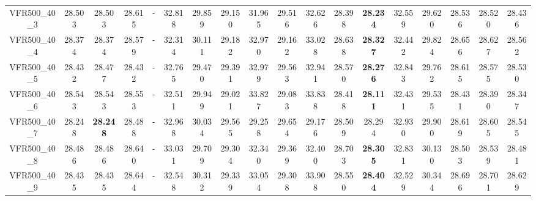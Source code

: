 \begin{tabular}{cc|ccc|ccccccccccccc}
VFR500\_40\_3      & 28.503           & 28.503           & 28.615           & -                & 32.818           & 29.859           & 29.150           & 31.965           & 29.516           & 32.626           & 28.398           & {\bf 28.234}     & 32.559           & 29.620           & 28.536           & 28.520           & 28.436          \\ 
VFR500\_40\_4      & 28.374           & 28.374           & 28.579           & -                & 32.314           & 30.111           & 29.182           & 32.970           & 29.162           & 33.028           & 28.638           & {\bf 28.327}     & 32.442           & 29.824           & 28.656           & 28.627           & 28.562          \\ 
VFR500\_40\_5      & 28.432           & 28.477           & 28.432           & -                & 32.765           & 29.470           & 29.391           & 32.979           & 29.563           & 32.941           & 28.570           & {\bf 28.276}     & 32.843           & 29.762           & 28.615           & 28.575           & 28.530          \\ 
VFR500\_40\_6      & 28.543           & 28.543           & 28.553           & -                & 32.511           & 29.949           & 29.021           & 33.827           & 29.083           & 33.838           & 28.418           & {\bf 28.111}     & 32.431           & 29.535           & 28.431           & 28.390           & 28.347          \\ 
VFR500\_40\_7      & 28.248           & {\bf 28.248}     & 28.488           & -                & 32.968           & 30.034           & 29.565           & 29.258           & 29.654           & 29.176           & 28.509           & 28.294           & 32.930           & 29.900           & 28.619           & 28.605           & 28.545          \\ 
VFR500\_40\_8      & 28.486           & 28.486           & 28.640           & -                & 33.031           & 29.709           & 29.304           & 32.340           & 29.369           & 32.400           & 28.703           & {\bf 28.305}     & 32.831           & 30.130           & 28.503           & 28.539           & 28.481          \\ 
VFR500\_40\_9      & 28.435           & 28.435           & 28.644           & -                & 32.548           & 30.312           & 29.339           & 33.054           & 29.308           & 33.908           & 28.550           & {\bf 28.404}     & 32.529           & 30.344           & 28.696           & 28.701           & 28.629          \\ 

\end{tabular}

